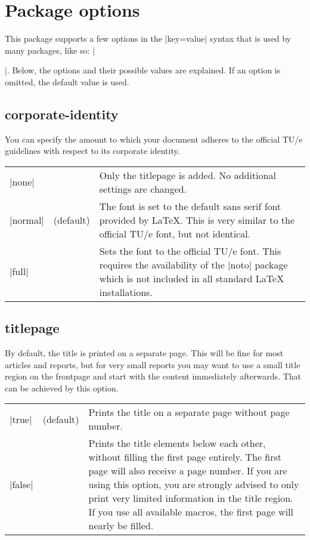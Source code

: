 \section{Package options}
\label{sec:package-options}
This package supports a few options in the |key=value| syntax that is used by many packages, like so: |\usepackage[key1=value1, key2=value2]{tu/e}|. Below, the options and their possible values are explained. If an option is omitted, the default value is used.

\subsection{corporate-identity}
You can specify the amount to which your document adheres to the official TU/e guidelines with respect to its corporate identity.

\begin{tabularx}{\textwidth}{llX} \toprule
  |none| & & Only the titlepage is added. No additional settings are changed. \\
  |normal| & (default) & The font is set to the default sans serif font provided by \LaTeX{}. This is very similar to the official TU/e font, but not identical. \\
  |full| & & Sets the font to the official TU/e font. This requires the availability of the |noto| package which is not included in all standard \LaTeX{} installations. \\ \bottomrule
\end{tabularx}

\subsection{titlepage}
By default, the title is printed on a separate page. This will be fine for most articles and reports, but for very small reports you may want to use a small title region on the frontpage and start with the content immediately afterwards. That can be achieved by this option.

\begin{tabularx}{\textwidth}{llX} \toprule
  |true| & (default) & Prints the title on a separate page without page number. \\
  |false| & & Prints the title elements below each other, without filling the first page entirely. The first page will also receive a page number. If you are using this option, you are strongly advised to only print very limited information in the title region. If you use all available macros, the first page will nearly be filled. \\ \bottomrule
\end{tabularx}

